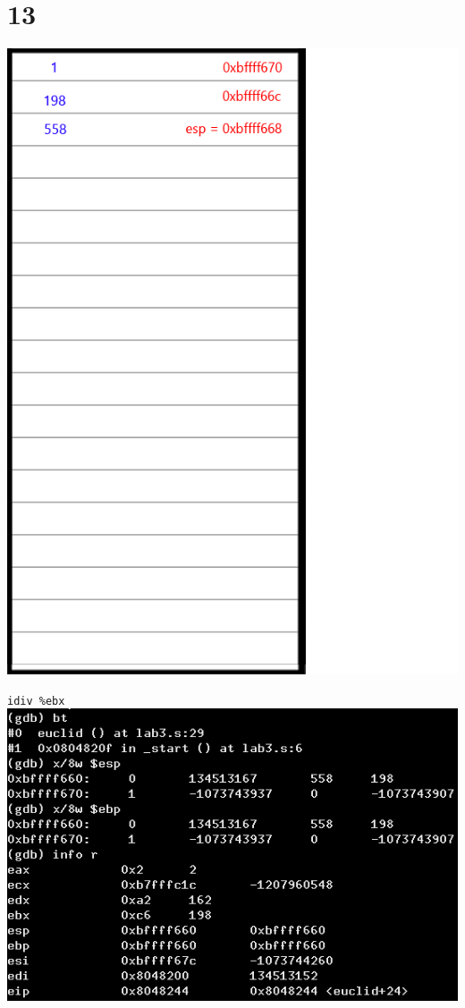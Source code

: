 \documentclass{article}
\begin{document}
\section*{13}
\begin{minipage}{5cm}
\includegraphics[scale=0.3]{s3.png}
\end{minipage}
\begin{minipage}{8cm}
\verb|idiv %ebx|\\
\includegraphics[scale=0.4]{bxi13.png} \\
\end{minipage}
\clearpage
\end{document}
